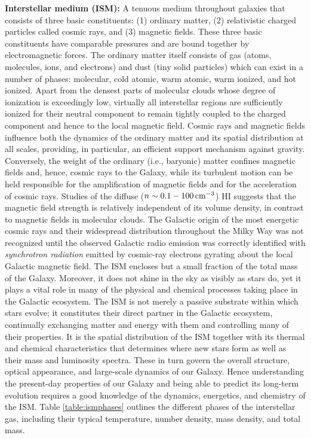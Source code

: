 \documentclass[a4paper,11pt]{article}
\begin{document}
{\noindent}\textbf{Interstellar medium (ISM):} A tenuous medium throughout galaxies that consists of three basic constituents: (1) ordinary matter, (2) relativistic charged particles called cosmic rays, and (3) magnetic fields. These three basic constituents have comparable pressures and are bound together by electromagnetic forces. The ordinary matter itself consists of gas (atoms, molecules, ions, and electrons) and dust (tiny solid particles) which can exist in a number of phases: molecular, cold atomic, warm atomic, warm ionized, and hot ionized. Apart from the densest parts of molecular clouds whose degree of ionization is exceedingly low, virtually all interstellar regions are sufficiently ionized for their neutral component to remain tightly coupled to the charged component and hence to the local magnetic field. Cosmic rays and magnetic fields influence both the dynamics of the ordinary matter and its spatial distribution at all scales, providing, in particular, an efficient support mechanism against gravity. Conversely, the weight of the ordinary (i.e., baryonic) matter confines magnetic fields and, hence, cosmic rays to the Galaxy, while its turbulent motion can be held responsible for the amplification of magnetic fields and for the acceleration of cosmic rays. Studies of the diffuse ($n\sim0.1-100\,{\rm cm^{-3}}$) HI suggests that the magnetic field strength is relatively independent of its volume density, in contrast to magnetic fields in molecular clouds. The Galactic origin of the most energetic cosmic rays and their widespread distribution throughout the Milky Way was not recognized until the observed Galactic radio emission was correctly identified with \textit{synchrotron radiation} emitted by cosmic-ray electrons gyrating about the local Galactic magnetic field. The ISM encloses but a small fraction of the total mass of the Galaxy. Moreover, it does not shine in the sky as visibly as stars do, yet it plays a vital role in many of the physical and chemical processes taking place in the Galactic ecosystem. The ISM is not merely a passive substrate within which stars evolve; it constitutes their direct partner in the Galactic ecosystem, continually exchanging matter and energy with them and controlling many of their properties. It is the spatial distribution of the ISM together with its thermal and chemical characteristics that determines where new stars form as well as their mass and luminosity spectra. These in turn govern the overall structure, optical appearance, and large-scale dynamics of our Galaxy. Hence understanding the present-day properties of our Galaxy and being able to predict its long-term evolution requires a good knowledge of the dynamics, energetics, and chemistry of the ISM. Table \ref{table:ismphases} outlines the different phases of the interstellar gas, including their typical temperature, number density, mass density, and total mass.
\end{document}
